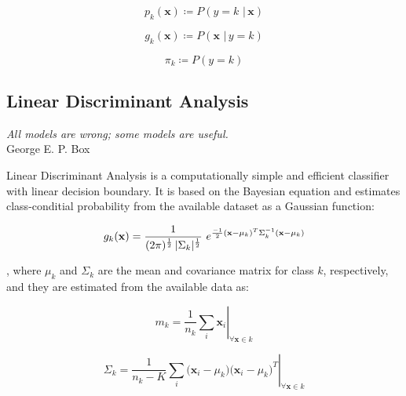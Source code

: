 \documentclass{article}
\begin{document}
\begin{equation} 
p_k(\mathbf{x}) \coloneqq P(y=k \,\, | \, \mathbf{x})
\end{equation}

\begin{equation} 
g_k(\mathbf{x}) \coloneqq P(\mathbf{x}  \,\, | \, y=k)
\end{equation}

\begin{equation} 
\pi_k \coloneqq P(y=k)
\end{equation}


\subsection{Linear Discriminant Analysis}

\begin{flushright}
\textit{All models are wrong; some models are useful.} \\George E. P. Box
\end{flushright}

Linear Discriminant Analysis is a computationally simple and efficient classifier with linear decision boundary.
It is based on the Bayesian equation and estimates class-conditial probability from the available dataset as a Gaussian function:

\begin{equation} 
g_k(\mathbf{x}) = \frac{1}{(2 \pi)^{\nicefrac{1}{2}}\, |\Sigma_k|^{\nicefrac{1}{2}}}\,\, e^{\nicefrac{-1}{2}  (\mathbf{x}-\mu_k)^T  \Sigma_k^{-1} (\mathbf{x}-\mu_k)} 
\end{equation}

, where $\mu_k$ and $\Sigma_k$ are the mean and covariance matrix for class $k$, respectively, and they are estimated from the available data as:

\begin{equation}
\left. m_k = \frac{1}{n_k} \sum_{i}{\mathbf{x}_i} \right\vert_{\forall \mathbf{x} \in k}
\end{equation}

\begin{equation}
\left. \Sigma_k = \frac{1}{n_k-K} \sum_{i}{\Big( \mathbf{x}_i - \mu_k \Big) \Big( \mathbf{x}_i - \mu_k \Big)^T} \right\vert_{\forall \mathbf{x} \in k}
\end{equation}


 
\end{document}
